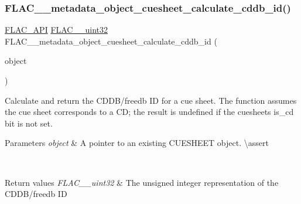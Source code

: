 \subsubsection{\texorpdfstring{FLAC\_\_metadata\_object\_cuesheet\_calculate\_cddb\_id()}{FLAC\_\_metadata\_object\_cuesheet\_calculate\_cddb\_id()}}
{\footnotesize\ttfamily \mbox{\hyperlink{group__flac__export_ga56ca07df8a23310707732b1c0007d6f5}{F\+L\+A\+C\+\_\+\+A\+PI}} \mbox{\hyperlink{ordinals_8h_a9c4005ea7ef8d564b0cc993cdd0e4e5e}{F\+L\+A\+C\+\_\+\+\_\+uint32}} F\+L\+A\+C\+\_\+\+\_\+metadata\+\_\+object\+\_\+cuesheet\+\_\+calculate\+\_\+cddb\+\_\+id (\begin{DoxyParamCaption}\item[{const \mbox{\hyperlink{struct_f_l_a_c_____stream_metadata}{F\+L\+A\+C\+\_\+\+\_\+\+Stream\+Metadata}} $\ast$}]{object }\end{DoxyParamCaption})}

Calculate and return the C\+D\+D\+B/freedb ID for a cue sheet. The function assumes the cue sheet corresponds to a CD; the result is undefined if the cuesheet\textquotesingle{}s is\+\_\+cd bit is not set.


\begin{DoxyParams}{Parameters}
{\em object} & A pointer to an existing C\+U\+E\+S\+H\+E\+ET object. \textbackslash{}assert 
\begin{DoxyCode}{1}
\end{DoxyCode}
 
\begin{DoxyCode}{1}
\end{DoxyCode}
 \\
\hline
\end{DoxyParams}

\begin{DoxyRetVals}{Return values}
{\em F\+L\+A\+C\+\_\+\+\_\+uint32} & The unsigned integer representation of the C\+D\+D\+B/freedb ID \\
\hline
\end{DoxyRetVals}
\mbox{\label{group__flac__metadata__object_ga3232bae96f19722bee19afd37fdc214d}} 
